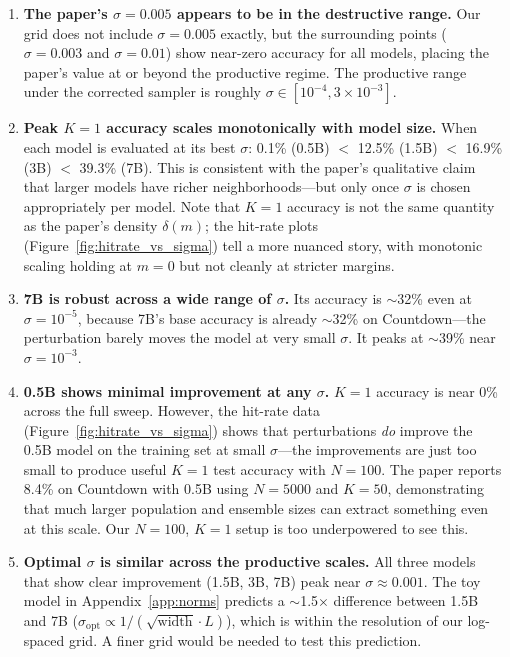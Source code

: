 \documentclass[11pt]{article}
\begin{document}
\begin{enumerate}
\item \textbf{The paper's $\sigma=0.005$ appears to be in the destructive range.} Our grid does not include $\sigma=0.005$ exactly, but the surrounding points ($\sigma=0.003$ and $\sigma=0.01$) show near-zero accuracy for all models, placing the paper's value at or beyond the productive regime. The productive range under the corrected sampler is roughly $\sigma\in[10^{-4}, 3{\times}10^{-3}]$.

\item \textbf{Peak $K=1$ accuracy scales monotonically with model size.} When each model is evaluated at its best $\sigma$: 0.1\% (0.5B) $<$ 12.5\% (1.5B) $<$ 16.9\% (3B) $<$ 39.3\% (7B). This is consistent with the paper's qualitative claim that larger models have richer neighborhoods---but only once $\sigma$ is chosen appropriately per model. Note that $K=1$ accuracy is not the same quantity as the paper's density $\delta(m)$; the hit-rate plots (Figure~\ref{fig:hitrate_vs_sigma}) tell a more nuanced story, with monotonic scaling holding at $m=0$ but not cleanly at stricter margins.

\item \textbf{7B is robust across a wide range of $\sigma$.} Its accuracy is $\sim$32\% even at $\sigma=10^{-5}$, because 7B's base accuracy is already $\sim$32\% on Countdown---the perturbation barely moves the model at very small $\sigma$. It peaks at $\sim$39\% near $\sigma=10^{-3}$.

\item \textbf{0.5B shows minimal improvement at any $\sigma$.} $K=1$ accuracy is near 0\% across the full sweep. However, the hit-rate data (Figure~\ref{fig:hitrate_vs_sigma}) shows that perturbations \emph{do} improve the 0.5B model on the training set at small $\sigma$---the improvements are just too small to produce useful $K=1$ test accuracy with $N=100$. The paper reports 8.4\% on Countdown with 0.5B using $N=5000$ and $K=50$, demonstrating that much larger population and ensemble sizes can extract something even at this scale. Our $N=100$, $K=1$ setup is too underpowered to see this.

\item \textbf{Optimal $\sigma$ is similar across the productive scales.} All three models that show clear improvement (1.5B, 3B, 7B) peak near $\sigma\approx 0.001$. The toy model in Appendix~\ref{app:norms} predicts a $\sim$1.5$\times$ difference between 1.5B and 7B ($\sigma_{\text{opt}}\propto 1/(\sqrt{\text{width}}\cdot L)$), which is within the resolution of our log-spaced grid. A finer grid would be needed to test this prediction.
\end{enumerate}
\end{document}
